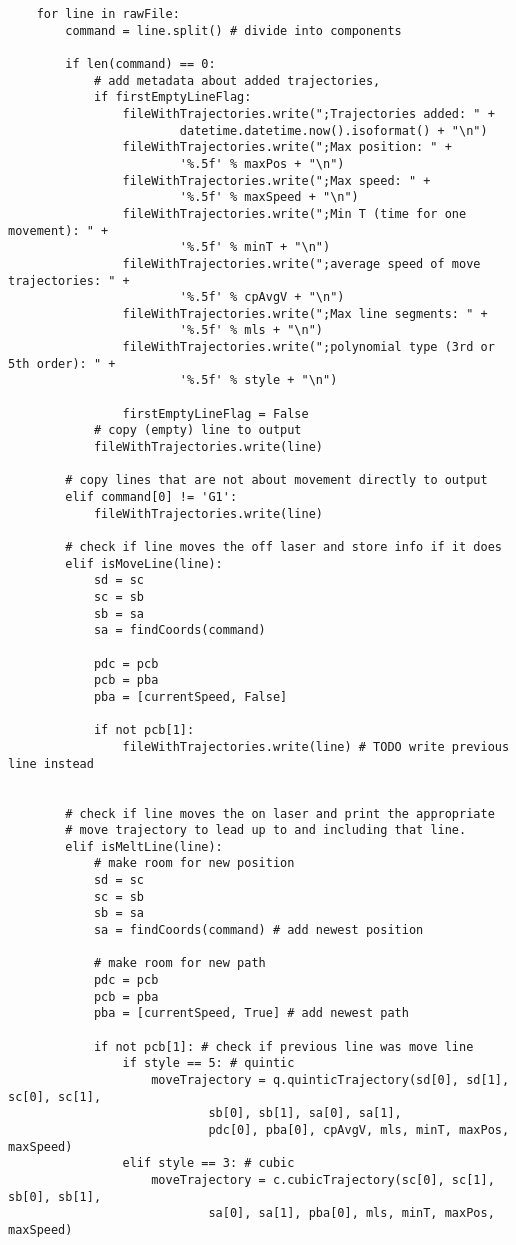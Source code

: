 \begin{verbatim}
    for line in rawFile:
        command = line.split() # divide into components

        if len(command) == 0:
            # add metadata about added trajectories,
            if firstEmptyLineFlag:
                fileWithTrajectories.write(";Trajectories added: " +
                        datetime.datetime.now().isoformat() + "\n")
                fileWithTrajectories.write(";Max position: " +
                        '%.5f' % maxPos + "\n")
                fileWithTrajectories.write(";Max speed: " +
                        '%.5f' % maxSpeed + "\n")
                fileWithTrajectories.write(";Min T (time for one movement): " +
                        '%.5f' % minT + "\n")
                fileWithTrajectories.write(";average speed of move trajectories: " +
                        '%.5f' % cpAvgV + "\n")
                fileWithTrajectories.write(";Max line segments: " +
                        '%.5f' % mls + "\n")
                fileWithTrajectories.write(";polynomial type (3rd or 5th order): " +
                        '%.5f' % style + "\n")

                firstEmptyLineFlag = False
            # copy (empty) line to output
            fileWithTrajectories.write(line)

        # copy lines that are not about movement directly to output
        elif command[0] != 'G1':
            fileWithTrajectories.write(line)

        # check if line moves the off laser and store info if it does
        elif isMoveLine(line):
            sd = sc
            sc = sb
            sb = sa
            sa = findCoords(command)

            pdc = pcb
            pcb = pba
            pba = [currentSpeed, False]

            if not pcb[1]:
                fileWithTrajectories.write(line) # TODO write previous line instead

        
        # check if line moves the on laser and print the appropriate
        # move trajectory to lead up to and including that line.
        elif isMeltLine(line):
            # make room for new position
            sd = sc
            sc = sb
            sb = sa
            sa = findCoords(command) # add newest position

            # make room for new path
            pdc = pcb
            pcb = pba
            pba = [currentSpeed, True] # add newest path

            if not pcb[1]: # check if previous line was move line 
                if style == 5: # quintic
                    moveTrajectory = q.quinticTrajectory(sd[0], sd[1], sc[0], sc[1],
                            sb[0], sb[1], sa[0], sa[1],
                            pdc[0], pba[0], cpAvgV, mls, minT, maxPos, maxSpeed)
                elif style == 3: # cubic
                    moveTrajectory = c.cubicTrajectory(sc[0], sc[1], sb[0], sb[1],
                            sa[0], sa[1], pba[0], mls, minT, maxPos, maxSpeed)


\end{verbatim}
